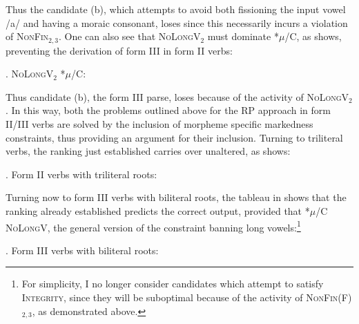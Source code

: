 \documentclass[12pt,twoside,letterpaper]{article}
\begin{document}
Thus the candidate (b), which attempts to avoid both fissioning the input vowel /a/ and having a moraic consonant, loses since this necessarily incurs a violation of \textsc{NonFin}$_{2,3}$. One can also see that \textsc{NoLongV}$_2$ must dominate \textsc{*$\mu$/C}, as \Next shows, preventing the derivation of form III in form II verbs:

\pagebreak

\ex. \textsc{NoLongV}$_2$ \OTdom \textsc{*$\mu$/C}:\\\begin{OTtableau}{2}
\end{OTtableau}

Thus candidate (b), the form III parse, loses because of the activity of \textsc{NoLongV}$_2$. In this way, both the problems outlined above for the RP approach in form II/III verbs are solved by the inclusion of morpheme specific markedness constraints, thus providing an argument for their inclusion. Turning to triliteral verbs, the ranking just established carries over unaltered, as \Next shows:

\ex. Form II verbs with triliteral roots:\\\begin{OTtableau}{3}
\end{OTtableau}

Turning now to form III verbs with biliteral roots, the tableau in \Next shows that the ranking already established predicts the correct output, provided that \textsc{*$\mu$/C} \OTdom \textsc{NoLongV}, the general version of the constraint banning long vowels:\footnote{For simplicity, I no longer consider candidates which attempt to satisfy \textsc{Integrity}, since they will be suboptimal because of the activity of \textsc{NonFin}(F)$_{2,3}$, as demonstrated above.}

\ex. Form III verbs with biliteral roots:\\\begin{OTtableau}{3}
  \OTcandrow*{[(marar)]}{*!, , }
\end{OTtableau}
\end{document}
